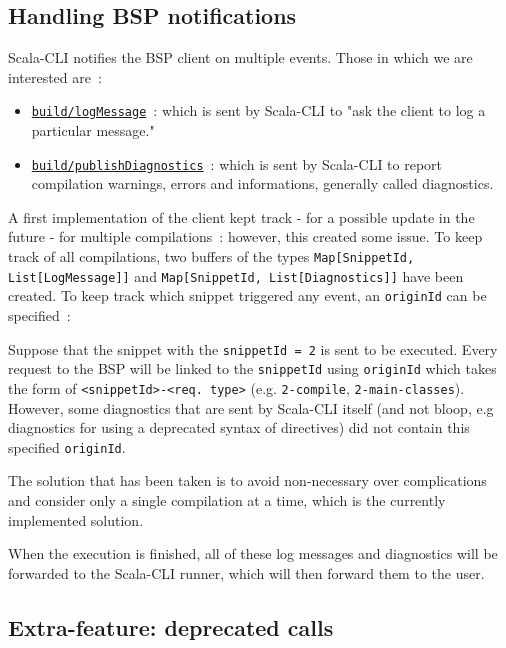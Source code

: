 \documentclass{article}
\begin{document}
\subsection{Handling BSP notifications}

Scala-CLI notifies the BSP client on multiple events. Those in which we are interested are~:

\begin{itemize}
    \item \href{https://build-server-protocol.github.io/docs/specification#log-message}{\lstinline{build/logMessage}}~: which is sent by Scala-CLI to "ask the client to log a particular message."
    \item \href{https://build-server-protocol.github.io/docs/specification#publish-diagnostics}{\lstinline{build/publishDiagnostics}}~: which is sent by Scala-CLI to report compilation warnings, errors and informations, generally called diagnostics.
\end{itemize}

A first implementation of the client kept track - for a possible update in the future - for multiple compilations~: however, this created some issue. To keep track of all compilations, two buffers of the types \lstinline{Map[SnippetId, List[LogMessage]]} and \lstinline{Map[SnippetId, List[Diagnostics]]} have been created. To keep track which snippet triggered any event, an \lstinline{originId} can be specified~:

Suppose that the snippet with the \lstinline{snippetId = 2} is sent to be executed. Every request to the BSP will be linked to the \lstinline{snippetId} using \lstinline{originId} which takes the form of \lstinline{<snippetId>-<req. type>} (e.g. \lstinline{2-compile}, \lstinline{2-main-classes}). However, some diagnostics that are sent by Scala-CLI itself (and not bloop, e.g diagnostics for using a deprecated syntax of directives) did not contain this specified \lstinline{originId}.

The solution that has been taken is to avoid non-necessary over complications and consider only a single compilation at a time, which is the currently implemented solution.

When the execution is finished, all of these log messages and diagnostics will be forwarded to the Scala-CLI runner, which will then forward them to the user.

\subsection{Extra-feature: deprecated calls}
\end{document}
